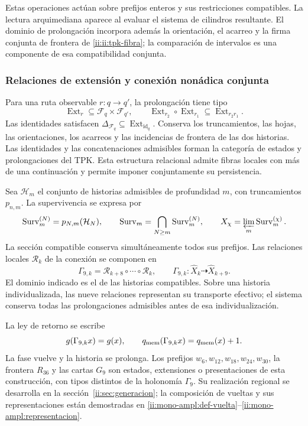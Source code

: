 Estas operaciones actúan sobre prefijos enteros y sus restricciones
compatibles. La lectura arquimediana aparece al evaluar el sistema de
cilindros resultante. El dominio de prolongación incorpora además la
orientación, el acarreo y la firma conjunta de frontera de
\eqref{ii:ii:tpk-fibra}; la comparación de intervalos es una componente de
esa compatibilidad conjunta.

\subsubsection{Relaciones de extensión y conexión nonádica conjunta}

Para una ruta observable \(r:q\to q'\), la prolongación tiene tipo
\[
 \operatorname{Ext}_r\subseteq\mathcal F_q\times\mathcal F_{q'},
 \qquad
 \operatorname{Ext}_{r_2}\circ\operatorname{Ext}_{r_1}
 \subseteq\operatorname{Ext}_{r_2r_1}.
\]
Las identidades satisfacen
\(\Delta_{\mathcal F_q}\subseteq
\operatorname{Ext}_{\operatorname{id}_q}\).
Conserva los truncamientos, las hojas, las orientaciones, los acarreos y
las incidencias de frontera de las dos historias. Las identidades y las
concatenaciones admisibles forman la categoría de estados y prolongaciones
del TPK. Esta estructura relacional admite fibras locales con más de una
continuación y permite imponer conjuntamente su persistencia.

Sea \(\mathcal H_m\) el conjunto de historias admisibles de profundidad
\(m\), con truncamientos \(p_{n,m}\). La supervivencia se expresa por
\[
 \operatorname{Surv}_m^{(N)}=p_{N,m}(\mathcal H_N),\qquad
 \operatorname{Surv}_m=\bigcap_{N\geq m}
 \operatorname{Surv}_m^{(N)},\qquad
 X_\chi=\varprojlim_m\operatorname{Surv}_m^{(\chi)}.
\]
La sección compatible conserva simultáneamente todos sus prefijos. Las
relaciones locales \(\mathcal R_k\) de la conexión se componen en
\begin{equation}
 \Gamma_{9,k}=\mathcal R_{k+8}\circ\cdots\circ\mathcal R_k,\qquad
 \Gamma_{9,k}:\widehat X_k\dashrightarrow\widehat X_{k+9}.
 \label{ii:ii:tpk-holonomia}
\end{equation}
El dominio indicado es el de las historias compatibles. Sobre una historia
individualizada, las nueve relaciones representan su transporte efectivo;
el sistema conserva todas las prolongaciones admisibles antes de esa
individualización.

La ley de retorno se escribe
\[
 g(\Gamma_{9,k}x)=g(x),\qquad
 q_{\rm mem}(\Gamma_{9,k}x)=q_{\rm mem}(x)+1.
\]
La fase vuelve y la historia se prolonga. Los prefijos
\(w_6,w_{12},w_{18},w_{24},w_{30}\), la frontera \(R_{36}\) y las
cartas \(G_9\) son estados, extensiones o presentaciones de esta
construcción, con tipos distintos de la holonomía \(\Gamma_9\).
Su realización regional se desarrolla en la sección~\ref{ii:sec:generacion};
la composición de vueltas y sus representaciones están demostradas en
\ref{ii:mono-ampl:def-vuelta}--\ref{ii:mono-ampl:representacion}.

